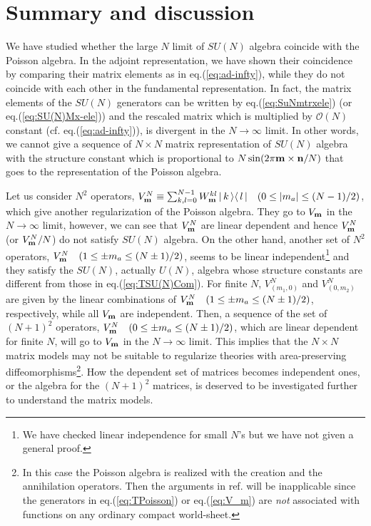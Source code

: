 \documentclass[a4paper,12pt]{article}
\newcommand{\bra}[1]{\langle\,#1\,|}
\newcommand{\ket}[1]{|\,#1\,\rangle}
\begin{document}
\section{Summary and discussion}
We have studied whether the large $N$ limit of $SU(N)$ algebra
coincide with the Poisson algebra. In the adjoint representation, we
have shown their coincidence by comparing their matrix elements as in
eq.(\ref{eq:ad-infty}), while they do not coincide with each other in
the fundamental representation.
In fact, the matrix elements of the $SU(N)$ generators can be written
by eq.(\ref{eq:SuNmtrxele}) (or eq.(\ref{eq:SU(N)Mx-ele})) and the
rescaled matrix which is multiplied by $\mathcal{O}(N)$
constant (cf. eq.(\ref{eq:ad-infty})), is divergent in the
$N\rightarrow\infty$ limit. In other words, we cannot give a sequence 
of $N\times N$ matrix representation of $SU(N)$ algebra with the
structure constant which is proportional to $N\sin(2\pi{\bf
m}\times{\bf n}/N)$ that goes to the representation of the Poisson
algebra.

Let us consider $N^2$ operators, $V_{\bf m}^N \equiv\sum_{k,l=0}^{N-1}
W_{\bf m}^{kl}\,\ket{k}\bra{l}\quad (0\leq |m_a|\leq (N-1)/2)$,
which give another regularization of the Poisson algebra. They go to
$V_{\bf m}$  in the $N\rightarrow\infty$ limit, however, we can see
that $V_{\bf m}^N$ are linear dependent and hence $V_{\bf m}^N$ (or
$V_{\bf m}^N/N$) do not satisfy $SU(N)$ algebra.
On the other hand, another set of $N^2$ operators,  $V_{\bf m}^N
\quad(1\leq \pm m_a\leq (N\pm1)/2)$, seems to be linear
independent\footnote{We have checked linear independence for small
$N$'s but we have not given a general proof.} and they satisfy
the $SU(N)$, actually $U(N)$, algebra whose structure constants are
different from those in eq.(\ref{eq:TSU(N)Com}). For finite $N$,
$V_{(m_1,0)}^N$ and $V_{(0,m_2)}^N$ are given by the linear
combinations of $V_{\bf m}^N\quad(1\leq\pm m_a\leq (N\pm 1)/2)$,
respectively, while all $V_{\bf m}$ are independent.
Then, a sequence of the set of $(N+1)^2$ operators,
$V_{\bf m}^N\quad (0\leq\pm m_a\leq (N\pm 1)/2)$, which
are linear dependent for finite $N$, will go to $V_{\bf m}$ in the
$N\rightarrow\infty$ limit.
This implies that the $N\times N$ matrix models may not be suitable to
regularize theories with area-preserving diffeomorphisms\footnote{
In this case the Poisson algebra is realized with the creation
and the annihilation operators. Then the arguments in
ref.\cite{zunger} will be inapplicable since the generators in
eq.(\ref{eq:TPoisson}) or eq.(\ref{eq:V_m}) are {\it not} associated
with functions on any ordinary compact world-sheet.}.
How the dependent set of matrices becomes independent ones, or
the algebra for the $(N+1)^2$ matrices, is deserved to be investigated
further to understand the matrix models.
\end{document}
